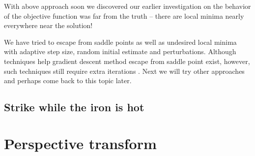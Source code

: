 \documentclass{article}
\begin{document}
With above approach soon we discovered our earlier investigation on the behavior of the objective function was far from the truth --
there are local minima nearly everywhere near the solution!

We have tried to escape from saddle points as well as undesired local minima with adaptive step size, random initial estimate and perturbations.
Although techniques help gradient descent method escape from saddle point exist,
however, such techniques still require extra iterations \citep{jin2017escape}.
Next we will try other approaches and perhaps come back to this topic later.

\subsection{Strike while the iron is hot}

\section{Perspective transform}



\end{document}
